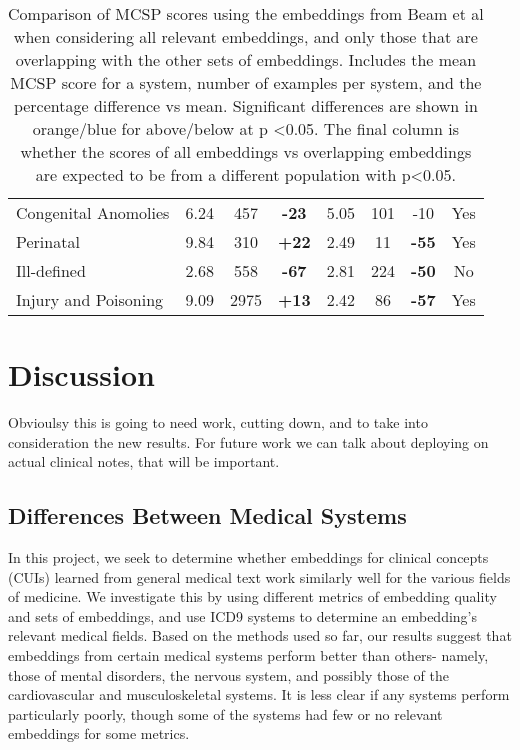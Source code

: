 \documentclass[11pt,a4paper]{article}
\def\blu#1{{\textbf{\color{blu}#1}}}
\def\red#1{{\color{red}#1}}
\def\ora#1{{\textbf{\color{ora}#1}}}
\begin{document}
\begin{table*}[h]
\begin{tabular}{l|c|c|c|c|c|c|c}
		Congenital Anomolies & 6.24  & 457      & \blu{-23}       & 5.05 & 101      & -10             & Yes        \\
		Perinatal            & 9.84  & 310      & \ora{+22}        & 2.49 & 11       & \blu{-55}       & Yes        \\
		Ill-defined          & 2.68  & 558      & \blu{-67}       & 2.81 & 224      & \blu{-50}       & No         \\
		Injury and Poisoning & 9.09  & 2975     & \ora{+13}        & 2.42 & 86       & \blu{-57}       & Yes             
	\end{tabular}
\caption{Comparison of MCSP scores using the embeddings from Beam et al when considering all relevant embeddings, and only those that are overlapping with the other sets of embeddings. Includes the mean MCSP score for a system, number of examples per system, and the percentage difference vs mean. Significant differences are shown in orange/blue for above/below at p \textless 0.05. The final column is whether the scores of all embeddings vs overlapping embeddings are expected to be from a different population with p\textless 0.05.}
\end{table*}

\section{Discussion}
\red{Obvioulsy this is going to need work, cutting down, and to take into consideration the new results. For future work we can talk about deploying on actual clinical notes, that will be important. }
\subsection{Differences Between Medical Systems}
In this project, we seek to determine whether embeddings for clinical concepts (CUIs) learned from general medical text work similarly well for the various fields of medicine. We investigate this by using different metrics of embedding quality and sets of embeddings, and use ICD9 systems to determine an embedding's relevant medical fields. Based on the methods used so far, our results suggest that embeddings from certain medical systems perform better than others- namely, those of mental disorders, the nervous system, and possibly those of the cardiovascular and musculoskeletal systems. It is less clear if any systems perform particularly poorly, though some of the systems had few or no relevant embeddings for some metrics. 
\end{document}
